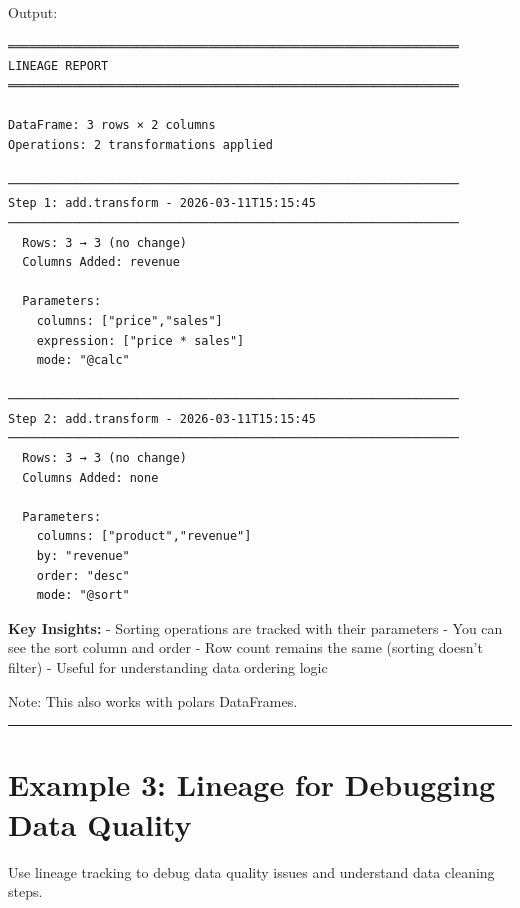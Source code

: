 \documentclass[
  letterpaper,
]{scrbook}
\begin{document}
Output:

\begin{verbatim}
═══════════════════════════════════════════════════════════════
LINEAGE REPORT
═══════════════════════════════════════════════════════════════

DataFrame: 3 rows × 2 columns
Operations: 2 transformations applied

───────────────────────────────────────────────────────────────
Step 1: add.transform - 2026-03-11T15:15:45
───────────────────────────────────────────────────────────────
  Rows: 3 → 3 (no change)
  Columns Added: revenue
  
  Parameters:
    columns: ["price","sales"]
    expression: ["price * sales"]
    mode: "@calc"

───────────────────────────────────────────────────────────────
Step 2: add.transform - 2026-03-11T15:15:45
───────────────────────────────────────────────────────────────
  Rows: 3 → 3 (no change)
  Columns Added: none
  
  Parameters:
    columns: ["product","revenue"]
    by: "revenue"
    order: "desc"
    mode: "@sort"
\end{verbatim}

\textbf{Key Insights:} - Sorting operations are tracked with their
parameters - You can see the sort column and order - Row count remains
the same (sorting doesn't filter) - Useful for understanding data
ordering logic

Note: This also works with polars DataFrames.

\begin{center}\rule{0.5\linewidth}{0.5pt}\end{center}

\section{Example 3: Lineage for Debugging Data
Quality}\label{example-3-lineage-for-debugging-data-quality}

Use lineage tracking to debug data quality issues and understand data
cleaning steps.
\end{document}
